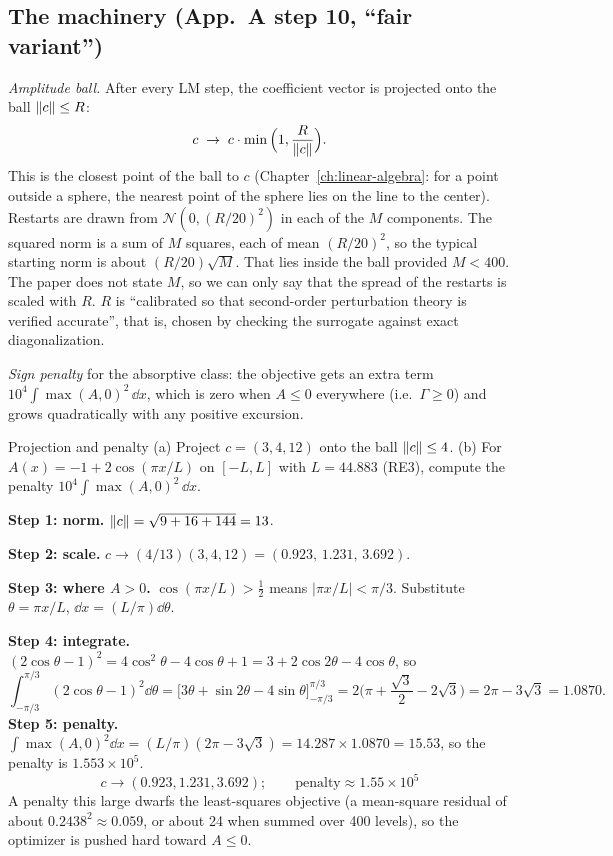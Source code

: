 \subsection{The machinery (App.~A step 10, ``fair variant'')}

\emph{Amplitude ball.} After every LM step, the coefficient vector is projected onto the ball $\left\lVert c\right\rVert\le R$:
\begin{equation}
c\;\to\;c\cdot\min\Big(1,\frac{R}{\left\lVert c\right\rVert}\Big).\label{eq:paper-spurious-floor-proj}
\end{equation}
This is the closest point of the ball to $c$ (Chapter~\ref{ch:linear-algebra}: for a point outside a sphere, the nearest point of the sphere lies on the line to the center). Restarts are drawn from $\mathcal N(0,(R/20)^2)$ in each of the $M$ components. The squared norm is a sum of $M$ squares, each of mean $(R/20)^2$, so the typical starting norm is about $(R/20)\sqrt M$. That lies inside the ball provided $M<400$. The paper does not state $M$, so we can only say that the spread of the restarts is scaled with $R$. $R$ is ``calibrated so that second-order perturbation theory is verified accurate'', that is, chosen by checking the surrogate against exact diagonalization.

\emph{Sign penalty} for the absorptive class: the objective gets an extra term $10^4\int\max(A,0)^2\,\dd x$, which is zero when $A\le0$ everywhere (i.e.\ $\Gamma\ge0$) and grows quadratically with any positive excursion.

\begin{sample}{Projection and penalty}
(a) Project $c=(3,4,12)$ onto the ball $\left\lVert c\right\rVert\le4$. (b) For $A(x)=-1+2\cos(\pi x/L)$ on $[-L,L]$ with $L=44.883$ (RE3), compute the penalty $10^4\int\max(A,0)^2\,\dd x$.

\textbf{Step 1: norm.} $\left\lVert c\right\rVert=\sqrt{9+16+144}=13$.

\textbf{Step 2: scale.} $c\to(4/13)(3,4,12)=(0.923,\,1.231,\,3.692)$.

\textbf{Step 3: where $A>0$.} $\cos(\pi x/L)>\tfrac12$ means $|\pi x/L|<\pi/3$. Substitute $\theta=\pi x/L$, $\dd x=(L/\pi)\dd\theta$.

\textbf{Step 4: integrate.} $(2\cos\theta-1)^2=4\cos^2\theta-4\cos\theta+1=3+2\cos2\theta-4\cos\theta$, so
\[
\int_{-\pi/3}^{\pi/3}(2\cos\theta-1)^2\dd\theta=\Big[3\theta+\sin2\theta-4\sin\theta\Big]_{-\pi/3}^{\pi/3}
=2\Big(\pi+\frac{\sqrt3}{2}-2\sqrt3\Big)=2\pi-3\sqrt3=1.0870 .
\]
\textbf{Step 5: penalty.} $\int\max(A,0)^2\dd x=(L/\pi)(2\pi-3\sqrt3)=14.287\times1.0870=15.53$, so the penalty is $1.553\times10^5$.
\[
\boxed{c\to(0.923,1.231,3.692);\qquad\text{penalty}\approx1.55\times10^5}
\]
A penalty this large dwarfs the least-squares objective (a mean-square residual of about $0.2438^2\approx0.059$, or about 24 when summed over 400 levels), so the optimizer is pushed hard toward $A\le0$.
\end{sample}

